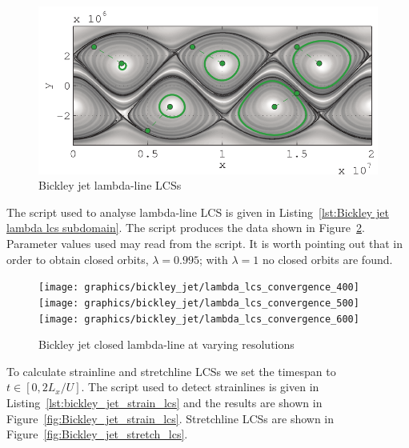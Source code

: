 \documentclass{article}
\begin{document}
\begin{figure}
  \centering
  \includegraphics[width=.85\textwidth]{graphics/bickley_jet/lambda_lcs_full}
  \caption{Bickley jet lambda-line LCSs}
  \label{fig:Bickley_jet_lambda_LCS_full}
\end{figure}

The script used to analyse lambda-line LCS is given in Listing~\ref{lst:Bickley jet lambda lcs subdomain}. The script produces the data shown in Figure~\ref{fig:Bickley jet lambda lcs convergence}. Parameter values used may read from the script. It is worth pointing out that in order to obtain closed orbits, $\lambda = 0.995$; with $\lambda = 1$ no closed orbits are found.



\begin{figure}[hbt]
  \centering
  \texttt{[image: graphics/bickley\_jet/lambda\_lcs\_convergence\_400]}
\texttt{[image: graphics/bickley\_jet/lambda\_lcs\_convergence\_500]}
\texttt{[image: graphics/bickley\_jet/lambda\_lcs\_convergence\_600]}
  \caption{Bickley jet closed lambda-line at varying resolutions}
  \label{fig:Bickley jet lambda lcs convergence}
\end{figure}

To calculate strainline and stretchline LCSs we set the timespan to $t \in [0,2L_x/U]$. The script used to detect strainlines is given in Listing~\ref{lst:bickley_jet_strain_lcs} and the results are shown in Figure~\ref{fig:Bickley_jet_strain_lcs}. Stretchline LCSs are shown in Figure~\ref{fig:Bickley_jet_stretch_lcs}.


\end{document}
